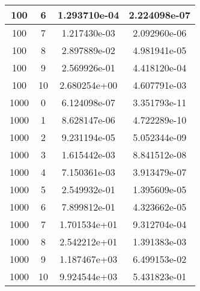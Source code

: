 \documentclass[a4paper,12pt]{article}
\begin{document}
\begin{table}[]
\begin{tabular}{|c|c|c|c|}
\rowcolor[HTML]{FDEED9} 
100  & 6  & 1.293710e-04 & 2.224098e-07 \\ \hline
\rowcolor[HTML]{FDEED9} 
100  & 7  & 1.217430e-03 & 2.092960e-06 \\ \hline
\rowcolor[HTML]{FDEED9} 
100  & 8  & 2.897889e-02 & 4.981941e-05 \\ \hline
\rowcolor[HTML]{FDEED9} 
100  & 9  & 2.569926e-01 & 4.418120e-04 \\ \hline
\rowcolor[HTML]{FDEED9} 
100  & 10 & 2.680254e+00 & 4.607791e-03 \\ \hline
\rowcolor[HTML]{FDEED9} 
1000 & 0  & 6.124098e-07 & 3.351793e-11 \\ \hline
\rowcolor[HTML]{FDEED9} 
1000 & 1  & 8.628147e-06 & 4.722289e-10 \\ \hline
\rowcolor[HTML]{FDEED9} 
1000 & 2  & 9.231194e-05 & 5.052344e-09 \\ \hline
\rowcolor[HTML]{FDEED9} 
1000 & 3  & 1.615442e-03 & 8.841512e-08 \\ \hline
\rowcolor[HTML]{FDEED9} 
1000 & 4  & 7.150361e-03 & 3.913479e-07 \\ \hline
\rowcolor[HTML]{FDEED9} 
1000 & 5  & 2.549932e-01 & 1.395609e-05 \\ \hline
\rowcolor[HTML]{FDEED9} 
1000 & 6  & 7.899812e-01 & 4.323662e-05 \\ \hline
\rowcolor[HTML]{FDEED9} 
1000 & 7  & 1.701534e+01 & 9.312704e-04 \\ \hline
\rowcolor[HTML]{FDEED9} 
1000 & 8  & 2.542212e+01 & 1.391383e-03 \\ \hline
\rowcolor[HTML]{FDEED9} 
1000 & 9  & 1.187467e+03 & 6.499153e-02 \\ \hline
\rowcolor[HTML]{FDEED9} 
1000 & 10 & 9.924544e+03 & 5.431823e-01 \\ \hline
\end{tabular}
\end{table}

\clearpage
\end{document}
